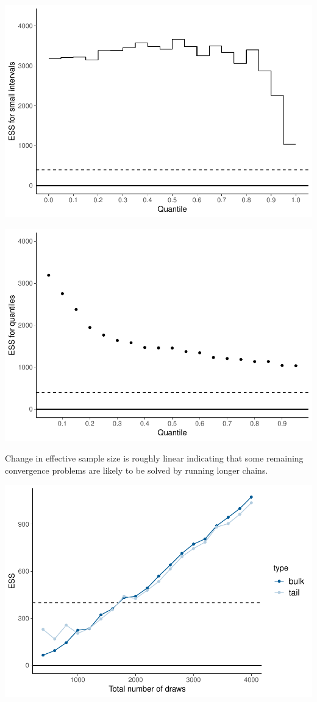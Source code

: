 \documentclass[american,]{article}
\begin{document}
\includegraphics{graphics/local-ess-jags-ncp-tau-1.pdf}

\includegraphics{graphics/quantile-ess-jags-ncp-tau-1.pdf}

Change in effective sample size is roughly linear indicating that some
remaining convergence problems are likely to be solved by running longer
chains.

\includegraphics{graphics/change-ess-jags-ncp-tau-1.pdf}
\end{document}
